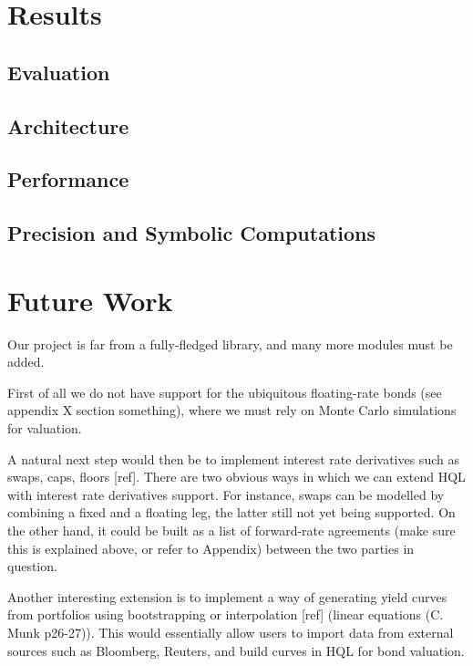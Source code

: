 \chapter{Results}

\section{Evaluation}

\section{Architecture}

\section{Performance}

\section{Precision and Symbolic Computations}

\chapter{Future Work}\label{chap:fw}

Our project is far from a fully-fledged library, and many more modules must be added.

First of all we do not have support for the ubiquitous floating-rate bonds (see appendix X section something), where we must rely on Monte Carlo simulations for valuation.

A natural next step would then be to implement interest rate derivatives such as swaps, caps, floors [ref].
There are two obvious ways in which we can extend HQL with interest rate derivatives support. For instance, swaps can be modelled by combining a fixed and a floating leg, the latter still not yet being supported. On the other hand, it could be built as a list of forward-rate agreements (make sure this is explained above, or refer to Appendix) between the two parties in question.

Another interesting extension is to implement a way of generating yield curves from portfolios using bootstrapping or interpolation [ref] (linear equations (C. Munk p26-27)). This would essentially allow users to import data from external sources such as Bloomberg, Reuters, and build curves in HQL for bond valuation.


